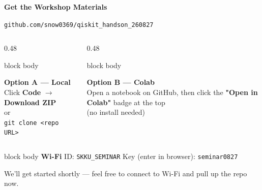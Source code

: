\documentclass{beamer}
\title{}
\author{}
\date{}
\begin{document}
\begin{frame}
  \centering
  {\Huge \textbf{Get the Workshop Materials}}

  \vspace{0.6cm}

  {\Large \faGithub \; \texttt{github.com/snow0369/qiskit\_handson\_260827}}

  \vspace{0.6cm}

  \begin{columns}[t,onlytextwidth]
    \begin{column}{0.48\textwidth}
      \begin{beamercolorbox}[sep=8pt,center,rounded=true,shadow=true,wd=\textwidth]{block body}
        \begin{minipage}[t][3cm][c]{0.9\textwidth}
          \centering
          \textbf{\large Option A --- Local}\\[6pt]
          Click \textbf{Code} $\rightarrow$ \textbf{Download ZIP}\\[4pt]
          or\\[4pt]
          {\footnotesize \texttt{git clone <repo URL>}}
        \end{minipage}
      \end{beamercolorbox}
    \end{column}
    \begin{column}{0.48\textwidth}
      \begin{beamercolorbox}[sep=8pt,center,rounded=true,shadow=true,wd=\textwidth]{block body}
        \begin{minipage}[t][3cm][c]{0.9\textwidth}
          \centering
          \textbf{\large Option B --- Colab}\\[6pt]
          Open a notebook on GitHub, then click the \textbf{"Open in Colab"} badge at the top\\[4pt]
          (no install needed)
        \end{minipage}
      \end{beamercolorbox}
    \end{column}
  \end{columns}

  \vspace{0.4cm}

  \begin{beamercolorbox}[sep=6pt,center,rounded=true,shadow=true]{block body}
    \small \faWifi \; \textbf{Wi-Fi} \quad ID: \texttt{SKKU\_SEMINAR} \quad Key (enter in browser): \texttt{seminar0827}
  \end{beamercolorbox}

  \vspace{0.3cm}
  {\small We'll get started shortly --- feel free to connect to Wi-Fi and pull up the repo now.}

\end{frame}
\end{document}
